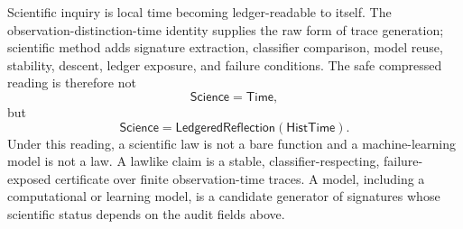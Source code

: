 \begin{remark}[Reading]
\label{rem:scientific-inquiry-hist-time-reading}
Scientific inquiry is local time becoming ledger-readable to itself. The
observation-distinction-time identity supplies the raw form of trace
generation; scientific method adds signature extraction, classifier
comparison, model reuse, stability, descent, ledger exposure, and failure
conditions. The safe compressed reading is therefore not
$$
\mathsf{Science}=\mathsf{Time},
$$
but
$$
\mathsf{Science}
=
\mathsf{LedgeredReflection}(\mathsf{HistTime}).
$$
Under this reading, a scientific law is not a bare function and a
machine-learning model is not a law. A lawlike claim is a stable,
classifier-respecting, failure-exposed certificate over finite
observation-time traces. A model, including a computational or learning
model, is a candidate generator of signatures whose scientific status
depends on the audit fields above.
\end{remark}

